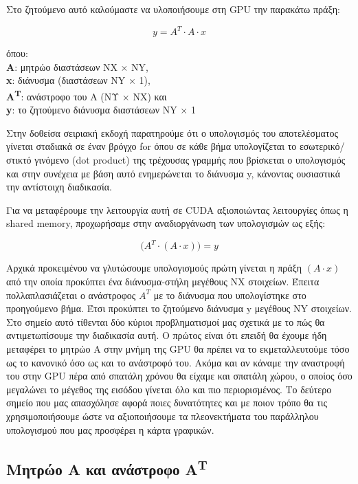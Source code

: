 
\noindent Στο ζητούμενο αυτό καλούμαστε να υλοποιήσουμε στη GPU την παρακάτω πράξη:

\vspace{-0.5cm}
$$ y = A^{T} \cdot A \cdot x$$

\noindent όπου:\\
\textbf{Α}: μητρώο διαστάσεων NX × NY,\\
\textbf{x}: διάνυσμα (διαστάσεων NY × 1),\\
\textbf{Α\textsuperscript{T}}: ανάστροφο του A (NΥ × NΧ) και\\
\textbf{y}: το ζητούμενο διάνυσμα διαστάσεων NY × 1

Στην δοθείσα σειριακή εκδοχή παρατηρούμε ότι ο υπολογισμός του αποτελέσματος γίνεται σταδιακά σε έναν βρόγχο for όπου σε κάθε βήμα υπολογίζεται το εσωτερικό/στικτό γινόμενο (dot product) της τρέχουσας γραμμής που βρίσκεται ο υπολογισμός και στην συνέχεια με βάση αυτό ενημερώνεται το διάνυσμα y, κάνοντας ουσιαστικά την αντίστοιχη διαδικασία.

\noindent Για να μεταφέρουμε την λειτουργία αυτή σε CUDA αξιοποιώντας λειτουργίες όπως η shared memory, προχωρήσαμε στην αναδιοργάνωση των υπολογισμών ως εξής:

\vspace{-0.4cm}
$$ \Big( A^{T} \cdot ( A \cdot x ) \Big) = y$$

Αρχικά προκειμένου να γλυτώσουμε υπολογισμούς πρώτη γίνεται η πράξη $( A \cdot x )$ από την οποία προκύπτει ένα διάνυσμα-στήλη μεγέθους NX στοιχείων. Έπειτα πολλαπλασιάζεται ο ανάστροφος $A^{T}$ με το διάνυσμα που υπολογίστηκε στο προηγούμενο βήμα. Έτσι προκύπτει το ζητούμενο διάνυσμα y μεγέθους NY στοιχείων. Στο σημείο αυτό τίθενται δύο κύριοι προβληματισμοί μας σχετικά με το πώς θα αντιμετωπίσουμε την διαδικασία αυτή. Ο πρώτος είναι ότι επειδή θα έχουμε ήδη μεταφέρει το μητρώο A στην μνήμη της GPU θα πρέπει να το εκμεταλλευτούμε τόσο ως το κανονικό όσο ως και το ανάστροφό του. Ακόμα και αν κάναμε την αναστροφή του στην GPU πέρα από σπατάλη χρόνου θα είχαμε και σπατάλη χώρου, ο οποίος όσο μεγαλώνει το μέγεθος της εισόδου γίνεται όλο και πιο περιορισμένος. Το δεύτερο σημείο που μας απασχόλησε αφορά ποιες δυνατότητες και με ποιον τρόπο θα τις χρησιμοποιήσουμε ώστε να αξιοποιήσουμε τα πλεονεκτήματα του παράλληλου υπολογισμού που μας προσφέρει η κάρτα γραφικών.

\subsection*{Μητρώο Α και ανάστροφο Α\textsuperscript{T}}


